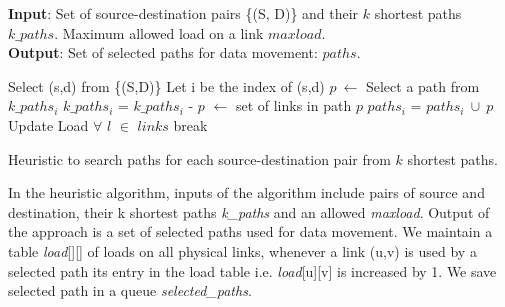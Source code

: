 \begin{algorithm}[!htbp]
\textbf{Input}: Set of source-destination pairs \{(S, D)\} and their $k$ shortest paths {$k\_paths$}. Maximum allowed load on a link $maxload$.\\
\textbf{Output}: Set of selected paths for data movement: {$paths$}.\\
\begin{algorithmic}
		\State Select (s,d) from \{(S,D)\} 
		\State Let i be the index of (s,d) 
		\State $p~\leftarrow$ Select a path from $k\_paths_i$ 
		\State $k\_paths_i$ = $k\_paths_i$ - {$p$} 
		 $\leftarrow$ set of links in path $p$ 
			\State $paths_i$ = $paths_i~\cup~{p}$ 
			\State Update Load $\forall$ $l$ $\in$ $links$ 
		\EndIf
			\State break 
		\EndIf
	\EndWhile
 \EndFunction
\end{algorithmic}
\caption{Heuristic to search paths for each source-destination pair from $k$ shortest paths.}
\label{alg:heu}
\end{algorithm}


In the heuristic algorithm, inputs of the algorithm include pairs of source and destination, their k shortest paths \textit{k\_paths} and an allowed \textit{maxload}. Output of the approach is a set of selected paths used for data movement. We maintain a table \textit{load}[][] of loads on all physical links, whenever a link (u,v) is used by a selected path its entry in the load table i.e. \textit{load}[u][v] is increased by 1. We save selected path in a queue \textit{selected\_paths}.


